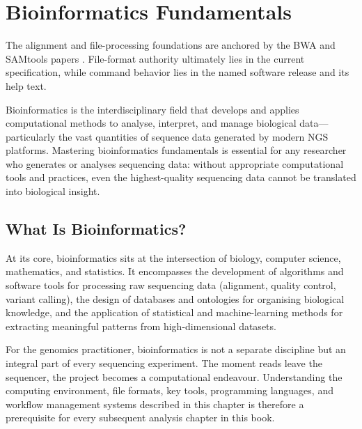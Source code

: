 \chapter{Bioinformatics Fundamentals}
\label{ch:bioinfofundamentals}

\begin{sourcebox}
The alignment and file-processing foundations are anchored by the BWA and SAMtools papers \cite{li2009bwa,li2009}. File-format authority ultimately lies in the current specification, while command behavior lies in the named software release and its help text.
\end{sourcebox}

\begin{keyconcept}
Bioinformatics is the interdisciplinary field that develops and applies computational methods to analyse, interpret, and manage biological data---particularly the vast quantities of sequence data generated by modern \acrshort{NGS} platforms. Mastering bioinformatics fundamentals is essential for any researcher who generates or analyses sequencing data: without appropriate computational tools and practices, even the highest-quality sequencing data cannot be translated into biological insight.
\end{keyconcept}

\section{What Is Bioinformatics?}
\label{sec:bioinf:what}

At its core, bioinformatics sits at the intersection of biology, computer science, mathematics, and statistics. It encompasses the development of algorithms and software tools for processing raw sequencing data (alignment, quality control, variant calling), the design of databases and ontologies for organising biological knowledge, and the application of statistical and machine-learning methods for extracting meaningful patterns from high-dimensional datasets.

For the genomics practitioner, bioinformatics is not a separate discipline but an integral part of every sequencing experiment. The moment reads leave the sequencer, the project becomes a computational endeavour. Understanding the computing environment, file formats, key tools, programming languages, and workflow management systems described in this chapter is therefore a prerequisite for every subsequent analysis chapter in this book.

